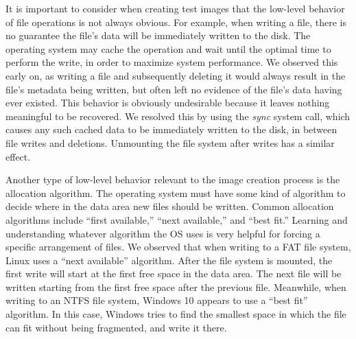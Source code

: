 \documentclass{ws-rv9x6}
\newenvironment{paraphrase}{\color{blue}}{\color{black}} %
\begin{document}
\begin{paraphrase}
It is important to consider when creating test images that the low-level behavior of file operations is not always obvious. For example, when writing a file, there is no guarantee the file's data will be immediately written to the disk. The operating system may cache the operation and wait until the optimal time to perform the write, in order to maximize system performance. We observed this early on, as writing a file and subsequently deleting it would always result in the file's metadata being written, but often left no evidence of the file's data having ever existed. This behavior is obviously undesirable because it leaves nothing meaningful to be recovered. We resolved this by using the \emph{sync} system call, which causes any such cached data to be immediately written to the disk, in between file writes and deletions. Unmounting the file system after writes has a similar effect.

Another type of low-level behavior relevant to the image creation process is the allocation algorithm. The operating system must have some kind of algorithm to decide where in the data area new files should be written. Common allocation algorithms include ``first available,'' ``next available,'' and ``best fit.''
Learning and understanding whatever algorithm the OS uses is very helpful for forcing a specific arrangement of files. We observed that when writing to a FAT file system, Linux uses a ``next available'' algorithm. After the file system is mounted, the first write will start at the first free space in the data area. The next file will be written starting from the first free space after the previous file.
Meanwhile, when writing to an NTFS file system, Windows 10 appears to use a ``best fit'' algorithm. In this case, Windows tries to find the smallest space in which the file can fit without being fragmented, and write it there.
\end{paraphrase}
\end{document}
